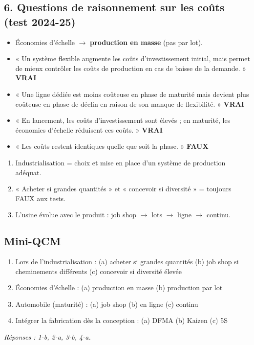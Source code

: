 \documentclass[11pt,a4paper]{article}
\newcommand{\vrai}{\textcolor{vert}{\textbf{VRAI}}}
\newcommand{\faux}{\textcolor{rouge}{\textbf{FAUX}}}
\begin{document}
\subsection*{6. Questions de raisonnement sur les coûts (test 2024-25)}
\begin{examen}
\begin{itemize}
\item Économies d'échelle $\rightarrow$ \textbf{production en masse} (pas par lot).
\item « Un système flexible augmente les coûts d'investissement initial, mais permet de mieux contrôler les coûts de production en cas de baisse de la demande. » \vrai
\item « Une ligne dédiée est moins coûteuse en phase de maturité mais devient plus coûteuse en phase de déclin en raison de son manque de flexibilité. » \vrai
\item « En lancement, les coûts d'investissement sont élevés ; en maturité, les économies d'échelle réduisent ces coûts. » \vrai
\item « Les coûts restent identiques quelle que soit la phase. » \faux
\end{itemize}
\end{examen}

\begin{resume}
\begin{enumerate}
\item Industrialisation = choix et mise en place d'un système de production adéquat.
\item « Acheter si grandes quantités » et « concevoir si diversité » = toujours FAUX aux tests.
\item L'usine évolue avec le produit : job shop $\rightarrow$ lots $\rightarrow$ ligne $\rightarrow$ continu.
\end{enumerate}
\end{resume}

\subsection*{Mini-QCM}
\begin{enumerate}
\item Lors de l'industrialisation : (a) acheter si grandes quantités (b) job shop si cheminements différents (c) concevoir si diversité élevée
\item Économies d'échelle : (a) production en masse (b) production par lot
\item Automobile (maturité) : (a) job shop (b) en ligne (c) continu
\item Intégrer la fabrication dès la conception : (a) DFMA (b) Kaizen (c) 5S
\end{enumerate}
{\small\textit{Réponses : 1-b, 2-a, 3-b, 4-a.}}
\end{document}
